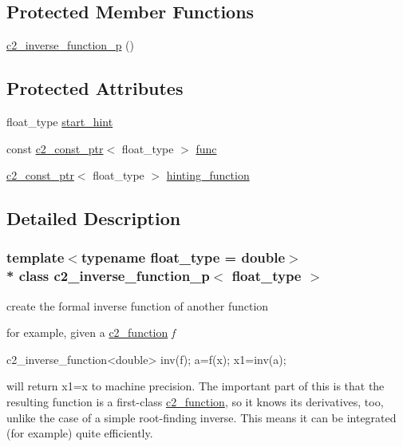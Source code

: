 \subsection*{Protected Member Functions}
\begin{DoxyCompactItemize}
\item 
\hyperlink{classc2__inverse__function__p_abe448ac1d22e9d47f11368a6ddc4508a}{c2\+\_\+inverse\+\_\+function\+\_\+p} ()
\end{DoxyCompactItemize}
\subsection*{Protected Attributes}
\begin{DoxyCompactItemize}
\item 
float\+\_\+type \hyperlink{classc2__inverse__function__p_a1d5e1f16d32ff5e8fef9e239ff5c18ed}{start\+\_\+hint}
\item 
const \hyperlink{classc2__const__ptr}{c2\+\_\+const\+\_\+ptr}$<$ float\+\_\+type $>$ \hyperlink{classc2__inverse__function__p_af8d083863a7965e901c684de7bd3cf8f}{func}
\item 
\hyperlink{classc2__const__ptr}{c2\+\_\+const\+\_\+ptr}$<$ float\+\_\+type $>$ \hyperlink{classc2__inverse__function__p_a4e1f68a44dea194ec1737fdcc8a7f17f}{hinting\+\_\+function}
\end{DoxyCompactItemize}


\subsection{Detailed Description}
\subsubsection*{template$<$typename float\+\_\+type = double$>$\\*
class c2\+\_\+inverse\+\_\+function\+\_\+p$<$ float\+\_\+type $>$}

create the formal inverse function of another function

for example, given a \hyperlink{classc2__function}{c2\+\_\+function} {\itshape f} 


\begin{DoxyCode}
c2\_inverse\_function<double> inv(f);
a=f(x);
x1=inv(a);
\end{DoxyCode}
 will return x1=x to machine precision. The important part of this is that the resulting function is a first-\/class \hyperlink{classc2__function}{c2\+\_\+function}, so it knows its derivatives, too, unlike the case of a simple root-\/finding inverse. This means it can be integrated (for example) quite efficiently.

